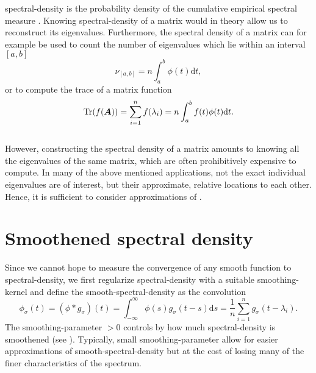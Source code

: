 \gls{spectral-density} is the probability density \cite{klenke2013probability}
of the cumulative empirical spectral measure \cite{chen2021slq}. Knowing \gls{spectral-density}
of a matrix would in theory allow us to reconstruct its eigenvalues.
Furthermore, the spectral density of a matrix can for example be used to count
the number of eigenvalues which lie within an interval $[a, b]$
\begin{equation}
    \nu_{[a, b]} = n \int_{a}^{b} \phi(t) \mathrm{d}t,
    \label{equ:1-introduction-eigenvalue-counting}
\end{equation}
or to compute the trace of a matrix function \cite{lin2017randomized}
\begin{equation}
    \operatorname{Tr}(f(\boldsymbol{A})) = \sum_{i=1}^n f(\lambda_i) = n \int_{a}^{b} f(t) \phi(t) \mathrm{d}t.
    \label{equ:1-introduction-matrix-trace}
\end{equation}\\

However, constructing the spectral density of a matrix amounts to knowing all
the eigenvalues of the same matrix, which are often prohibitively expensive to
compute. In many of the above mentioned applications, not the exact individual
eigenvalues are of interest, but their approximate, relative locations to each
other. Hence, it is sufficient to consider approximations of .



\section{Smoothened spectral density}
\label{sec:1-introduction-properties}

Since we cannot hope to measure the convergence of any smooth function to \gls{spectral-density},
we first regularize \gls{spectral-density} with a suitable \gls{smoothing-kernel}
and define the \gls{smooth-spectral-density} as the convolution
\begin{equation}
    \phi_{\sigma}(t) = (\phi \ast g_{\sigma})(t) = \int_{-\infty}^{\infty} \phi(s) g_{\sigma}(t - s) \mathrm{d}s = \frac{1}{n} \sum_{i=1}^{n} g_{\sigma}(t - \lambda_i).
    \label{equ:1-introduction-def-smooth-spectral-density}
\end{equation}
The \gls{smoothing-parameter} $>0$ controls by how much \gls{spectral-density} is
smoothened (see ). Typically,
small \gls{smoothing-parameter} allow for easier approximations of \gls{smooth-spectral-density}
but at the cost of losing many of the finer characteristics of the spectrum.

